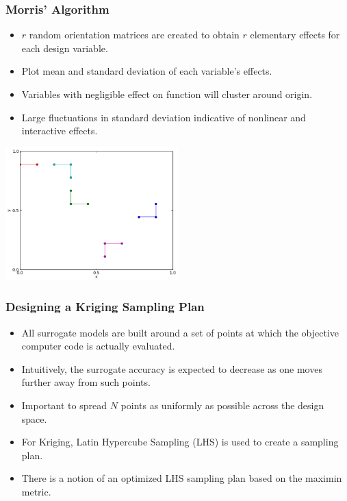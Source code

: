 \documentclass{beamer}
\begin{document}
\begin{frame}
\frametitle{Morris' Algorithm}

\begin{itemize}
  \item $r$ random orientation matrices are created to obtain $r$ elementary effects for each design variable. 
  \item Plot mean and standard deviation of each variable's effects.
  \item Variables with negligible effect on function will cluster around origin. 
  \item Large fluctuations in standard deviation indicative of nonlinear and interactive effects.              
\end{itemize}

\centering
\includegraphics[width=0.50\textwidth]{./morris_alg.png}

\end{frame}
\begin{frame}
\frametitle{Designing a Kriging Sampling Plan}

\begin{itemize}
  \item All surrogate models are built around a set of points at which the objective computer code is actually evaluated. 
  \item Intuitively, the surrogate accuracy is expected to decrease as one moves further away from such points. 
  \item Important to spread $N$ points as uniformly as possible across the design space.
  \item For Kriging, Latin Hypercube Sampling (LHS) is used to create a sampling plan.
  \item There is a notion of an optimized LHS sampling plan based on the maximin metric.   
\end{itemize}

\end{frame}
\end{document}
